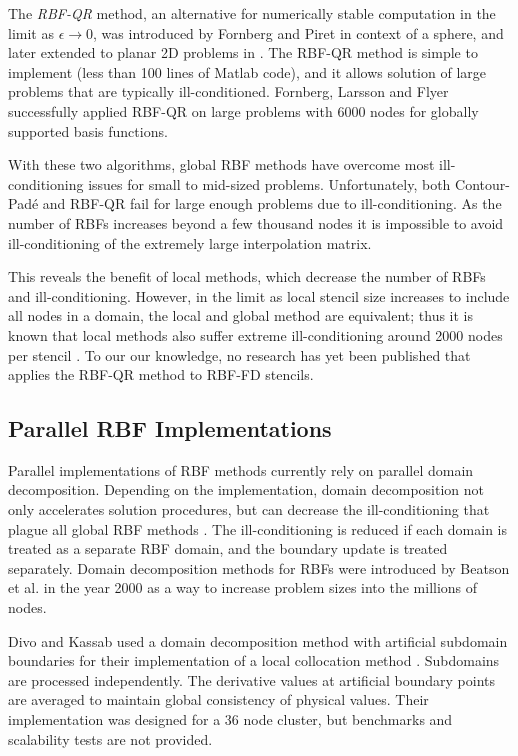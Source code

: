 \documentclass{report}
\begin{document}
{The \emph{RBF-QR} method, an alternative for numerically stable computation in the limit as $\epsilon \rightarrow 0$, was introduced by Fornberg  and 
Piret \cite{Fornberg2007} in context of a sphere, and later extended to planar 2D problems in \cite{Fornberg2009b}. The 
RBF-QR 
method is simple 
to implement (less than 100 lines of Matlab code), and it allows solution of large problems that are typically ill-conditioned. Fornberg, Larsson and Flyer \cite{Fornberg2009b} successfully applied RBF-QR on large problems with 6000 nodes for globally supported basis functions.  \cite{Fornberg2011a, Fornberg2011b}

With these two algorithms, global RBF methods have overcome most ill-conditioning issues for small to mid-sized problems. Unfortunately, both Contour-Pad\'{e} and RBF-QR fail for large enough problems due to ill-conditioning. As the number of RBFs increases beyond a few thousand nodes it is impossible to avoid  ill-conditioning of the extremely large interpolation matrix.

This reveals the benefit of local methods, which decrease the number of RBFs and ill-conditioning. However, in the limit as local stencil size increases to include all nodes in a domain, the local and global method are equivalent; thus it is known that local methods also suffer extreme ill-conditioning around 2000 nodes per stencil \cite{Shu2006}. To our our knowledge, no research has yet been published that applies the RBF-QR method to RBF-FD stencils.


\subsection{Parallel RBF Implementations}

Parallel implementations of RBF methods currently rely on parallel domain decomposition. Depending on the implementation, domain decomposition not only accelerates solution procedures, but can decrease the ill-conditioning that plague all global RBF methods \cite{Divo2007}. The ill-conditioning is reduced if each domain is treated as a separate RBF domain, and the boundary update is treated separately. Domain decomposition methods for RBFs were introduced by Beatson et al. \cite{Beatson2000} in the year 2000 as a way to increase problem sizes into the millions of nodes.

Divo and Kassab \cite{Divo2007} used a domain decomposition method with artificial 
subdomain boundaries for their implementation of a local collocation method \cite{Divo2007}. 
Subdomains are processed independently. The derivative values 
at artificial boundary points are averaged to maintain global consistency of physical values. Their implementation 
was designed for a 36 node cluster, but benchmarks and scalability tests are not provided.

}
\end{document}

